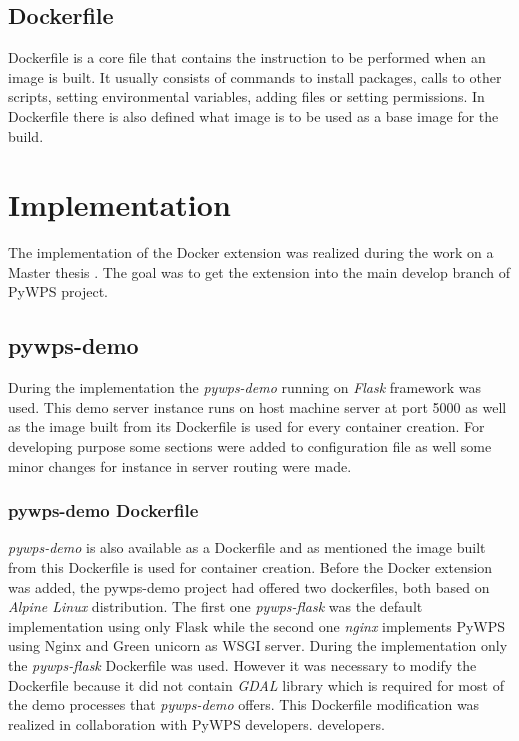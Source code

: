 \documentclass{gifce}
\begin{document}
\subsection{Dockerfile}
Dockerfile is a core file that contains the instruction to be performed when an image is built. It usually consists of commands to install packages, calls to other scripts, setting environmental variables, adding files or setting permissions. In Dockerfile there is also defined what image is to be used as a base image for the build.

\section{Implementation}
The implementation of the Docker extension was realized during
the work on a Master thesis \cite{thesis}. The goal was to get
the extension into the main develop branch of PyWPS project.

\subsection{pywps-demo}
During the implementation the \textit{pywps-demo}
running on \textit{Flask} framework was
used. This demo server instance runs on host machine server at port
5000 as well as the image built from its Dockerfile is used for every
container creation. For developing purpose some sections were added to
configuration file as well some minor changes for instance in server
routing were made.

\subsubsection{pywps-demo Dockerfile}
\textit{pywps-demo} is also available as a Dockerfile and as mentioned
the image built from this Dockerfile is used for container creation.
Before the Docker extension was added, the pywps-demo project had
offered two dockerfiles, both based on \textit{Alpine Linux}
distribution. The first one \textit{pywps-flask} was the default
implementation using only Flask while the second one \textit{nginx}
implements PyWPS using Nginx and Green unicorn as WSGI server. During
the implementation only the \textit{pywps-flask} Dockerfile was
used. However it was necessary to modify the Dockerfile because it did
not contain \textit{GDAL} library which is required for most of the
demo processes that \textit{pywps-demo} offers. This Dockerfile modification
was realized in collaboration with PyWPS developers.
developers.
\end{document}
